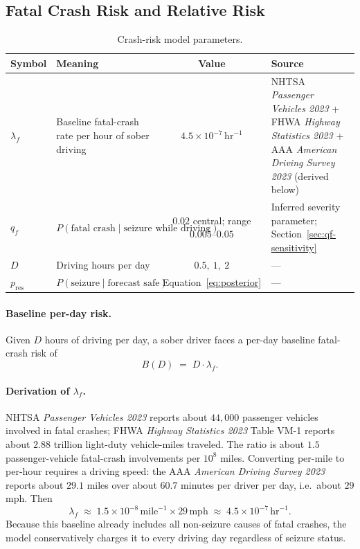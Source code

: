 \documentclass[11pt]{article}
\numberwithin{equation}{section}
\newcommand{\pres}{p_{\mathrm{res}}}
\begin{document}
\subsection{Fatal Crash Risk and Relative Risk}
\label{sec:crash-risk}

\begin{table}[htbp]
\caption{Crash-risk model parameters.}
\label{tab:params}
\centering
\renewcommand{\arraystretch}{1.25}
\begin{tabularx}{\linewidth}{lXcX}
\toprule
Symbol & Meaning & Value & Source \\
\midrule
$\lambda_f$ & Baseline fatal-crash rate per hour of sober driving
            & $4.5\times 10^{-7}\,\text{hr}^{-1}$
            & NHTSA \emph{Passenger Vehicles 2023} + FHWA \emph{Highway Statistics 2023}
              + AAA \emph{American Driving Survey 2023} (derived below) \\
$q_f$       & $P(\text{fatal crash} \mid \text{seizure while driving})$
            & $0.02$ central; range $0.005$--$0.05$
            & Inferred severity parameter; Section~\ref{sec:qf-sensitivity} \\
$D$         & Driving hours per day & $0.5,\ 1,\ 2$ & --- \\
$\pres$     & $P(\text{seizure} \mid \text{forecast safe})$
            & Equation~\eqref{eq:posterior} & --- \\
\bottomrule
\end{tabularx}
\end{table}

\paragraph{Baseline per-day risk.}
Given $D$ hours of driving per day, a sober driver faces a per-day baseline fatal-crash
risk of
\begin{equation}
B(D) \;=\; D \cdot \lambda_f.
\label{eq:baseline-day}
\end{equation}

\paragraph{Derivation of $\lambda_f$.}
NHTSA \emph{Passenger Vehicles 2023} reports about $44{,}000$ passenger vehicles
involved in fatal crashes; FHWA \emph{Highway Statistics 2023} Table VM-1 reports about
$2.88$ trillion light-duty vehicle-miles traveled. The ratio is about $1.5$
passenger-vehicle fatal-crash involvements per $10^{8}$ miles. Converting per-mile to
per-hour requires a driving speed: the AAA \emph{American Driving Survey 2023} reports
about $29.1$ miles over about $60.7$ minutes per driver per day, i.e.\ about $29$ mph.
Then
\begin{equation}
\lambda_f \;\approx\; 1.5\times 10^{-8}\,\text{mile}^{-1} \times 29\,\text{mph}
\;\approx\; 4.5 \times 10^{-7}\,\text{hr}^{-1}.
\label{eq:lambda-derivation}
\end{equation}
Because this baseline already includes all non-seizure causes of fatal crashes, the
model conservatively charges it to every driving day regardless of seizure status.
\end{document}
